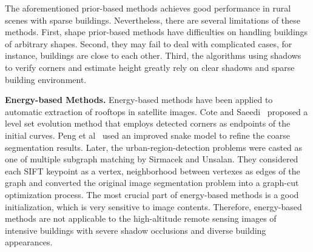 The aforementioned prior-based methods achieves good performance in rural scenes with sparse buildings.
Nevertheless, there are several limitations of these methods.
First, shape prior-based methods have difficulties on handling buildings of arbitrary shapes.
Second, they may fail to deal with complicated cases, for instance, buildings are close to each other.
Third, the algorithms using shadows to verify corners and estimate height greatly rely on clear shadows and sparse building environment.


\noindent\textbf{Energy-based Methods.} Energy-based methods have been applied to automatic extraction of rooftops in satellite images.
Cote and Saeedi~\cite{IEEEexample:cote2013automatic} proposed a level set evolution method that employs detected corners as endpoints of the initial curves.
Peng et al~\cite{IEEEexample:peng2005improved} used an improved snake model to refine the coarse segmentation results.
Later, the urban-region-detection problems were casted as one of multiple subgraph matching by Sirmacek and Unsalan\cite{IEEEexample:sirmacek2009urban}.
They considered each SIFT keypoint as a vertex, neighborhood between vertexes as edges of the graph and converted the original image segmentation problem into a graph-cut optimization process.
%
The most crucial part of energy-based methods is a good initialization, which is very sensitive to image contents.
Therefore, energy-based methods are not applicable to the high-altitude remote sensing images of intensive buildings with severe shadow occlusions and diverse building appearances.


